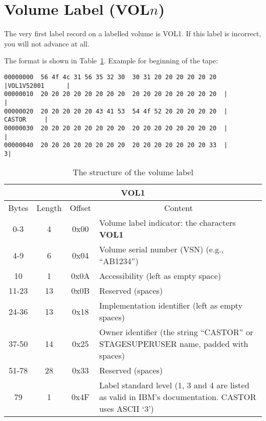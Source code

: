 \section{Volume Label (VOL$n$)}

The very first label record on a labelled volume is VOL1. If this label is incorrect, you will not advance at all.

The format is shown in Table~\ref{tab:volume_label}. Example for beginning of the tape:
\begin{samepage}
\begin{small}
\begin{verbatim}
00000000  56 4f 4c 31 56 35 32 30  30 31 20 20 20 20 20 20  |VOL1V52001      |
00000010  20 20 20 20 20 20 20 20  20 20 20 20 20 20 20 20  |                |
00000020  20 20 20 20 20 43 41 53  54 4f 52 20 20 20 20 20  |     CASTOR     |
00000030  20 20 20 20 20 20 20 20  20 20 20 20 20 20 20 20  |                |
00000040  20 20 20 20 20 20 20 20  20 20 20 20 20 20 20 33  |               3|
\end{verbatim}
\end{small}
\end{samepage}

\begin{table}[ht]
\caption{The structure of the volume label}
\label{tab:volume_label}
\begin{center}
\begin{tabularx}{\textwidth}{ |c|c|c|X| }
  \hline
  \multicolumn{4}{|c|}{VOL1} \\
  \hline
  Bytes & Length & Offset & \multicolumn{1}{c|}{Content} \\
  \hline \hline
  0-3 & 4 & 0x00 & Volume label indicator: the characters \textbf{VOL1} \\
  \hline
  4-9 & 6 & 0x04 & Volume serial number (VSN) (e.g., ``AB1234'') \\
  \hline
  10 & 1 & 0x0A & Accessibility (left as empty space) \\
  \hline
  11-23 & 13 & 0x0B & Reserved (spaces) \\
  \hline
  24-36 & 13 & 0x18 & Implementation identifier (left as empty spaces) \\
  \hline
  37-50 & 14 & 0x25 & Owner identifier (the string ``CASTOR'' or STAGESUPERUSER name, padded with spaces)\\
  \hline
  51-78 & 28 & 0x33 & Reserved (spaces) \\
  \hline
  79 & 1 & 0x4F & Label standard level (1, 3 and 4 are listed as valid in IBM's documentation. CASTOR uses ASCII `3') \\
  \hline
\end{tabularx}
\end{center}
\end{table}

